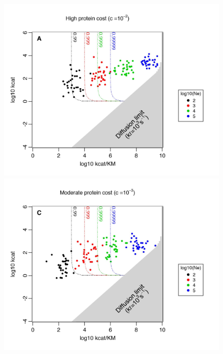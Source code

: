\begin{figure}[!p]
\begin{center}
\vspace{-0.75cm}
\begin{minipage}[c]{0.6\textwidth}
\begin{center}
    \includegraphics[scale=0.52,trim=0cm 0cm 0cm 0cm,clip]{pics/SM-Enzymes/Evo_Results_Cost_H.jpeg}
    \includegraphics[scale=0.52,trim=0cm 0cm 0cm 0cm,clip]{pics/SM-Enzymes/Evo_Results_Cost_M.jpeg}

\end{center}
\end{minipage}
\end{center}
\end{figure}
